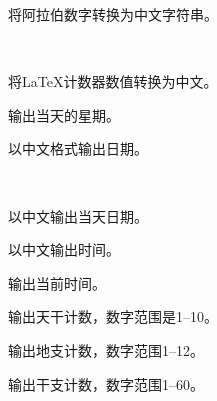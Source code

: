 将阿拉伯数字转换为中文字符串。
\begin{codeshow}
\\
\end{codeshow}

将\LaTeX 计数器数值转换为中文。

\begin{latex}
\end{latex}

输出当天的星期。

\begin{codeshow}
\end{codeshow}

以中文格式输出日期。

\begin{codeshow}
\\
\end{codeshow}

以中文输出当天日期。

\begin{codeshow}
\zhtoday
\end{codeshow}

以中文输出时间。

\begin{codeshow}
\end{codeshow}

输出当前时间。

\begin{codeshow}
\zhcurrtime
\end{codeshow}

输出天干计数，数字范围是1--10。

\begin{codeshow}
 
 
 
\end{codeshow}

输出地支计数，数字范围1--12。

\begin{codeshow}
  
  
\end{codeshow}

输出干支计数，数字范围1--60。

\begin{codeshow}
 
\\ 
 
\end{codeshow}

